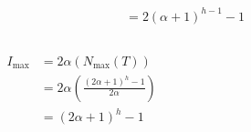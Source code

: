 \begin{frame}
\begin{columns}
\begin{column}{0.5\textwidth}
\begin{block}{}
\[\begin{aligned}
                        &= 2\left(\alpha + 1\right)^{h - 1} - 1
                    \end{aligned}
                \]
            \end{block}
        \end{column}
    \end{columns}
    \framebreak{}
    \begin{columns}
        \begin{column}{0.5\textwidth}
            \begin{block}{}
                \vspace{-0.75cm}
                \[
                    \begin{aligned}
                        I_{\text{max}} &= 2\alpha\left(N_{\text{max}}\left(T\right)\right) \\
                        &= 2\alpha \left(\frac{\left(2\alpha + 1\right)^h - 1}{2\alpha}\right) \\
                        &= \left(2\alpha + 1\right)^h - 1
                    \end{aligned}
                \]
            \end{block}
        \end{column}
        \begin{column}{0.5\textwidth}
            \begin{figure}

\end{figure}
\end{column}
\end{columns}
\end{frame}
